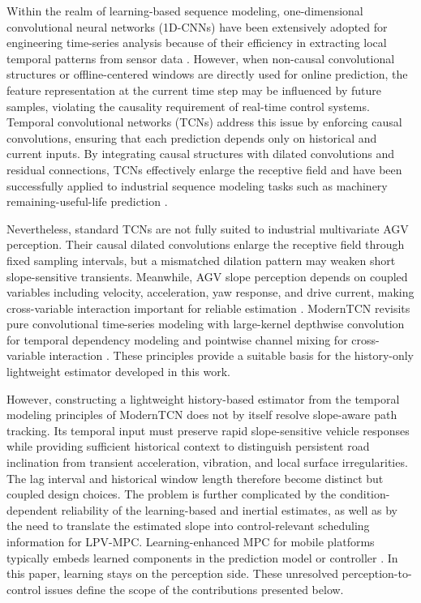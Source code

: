 \documentclass{ieeeaccess}
\newcommand{\citep}[1]{\cite{#1}}
\begin{document}
Within the realm of learning-based sequence modeling, one-dimensional convolutional neural networks (1D-CNNs) have been extensively adopted for engineering time-series analysis because of their efficiency in extracting local temporal patterns from sensor data \citep{Bueno2023Inception1DCNN}. However, when non-causal convolutional structures or offline-centered windows are directly used for online prediction, the feature representation at the current time step may be influenced by future samples, violating the causality requirement of real-time control systems. Temporal convolutional networks (TCNs) address this issue by enforcing causal convolutions, ensuring that each prediction depends only on historical and current inputs. By integrating causal structures with dilated convolutions and residual connections, TCNs effectively enlarge the receptive field and have been successfully applied to industrial sequence modeling tasks such as machinery remaining-useful-life prediction \citep{Bai2018TCN,Cao2021TCNRSA}.

Nevertheless, standard TCNs are not fully suited to industrial multivariate AGV perception. Their causal dilated convolutions enlarge the receptive field through fixed sampling intervals, but a mismatched dilation pattern may weaken short slope-sensitive transients. Meanwhile, AGV slope perception depends on coupled variables including velocity, acceleration, yaw response, and drive current, making cross-variable interaction important for reliable estimation \citep{Jin2023MTGODE}. ModernTCN revisits pure convolutional time-series modeling with large-kernel depthwise convolution for temporal dependency modeling and pointwise channel mixing for cross-variable interaction \citep{Luo2024ModernTCN}. These principles provide a suitable basis for the history-only lightweight estimator developed in this work.

However, constructing a lightweight history-based estimator from the temporal modeling principles of ModernTCN does not by itself resolve slope-aware path tracking. Its temporal input must preserve rapid slope-sensitive vehicle responses while providing sufficient historical context to distinguish persistent road inclination from transient acceleration, vibration, and local surface irregularities. The lag interval and historical window length therefore become distinct but coupled design choices. The problem is further complicated by the condition-dependent reliability of the learning-based and inertial estimates, as well as by the need to translate the estimated slope into control-relevant scheduling information for LPV-MPC. Learning-enhanced MPC for mobile platforms typically embeds learned components in the prediction model or controller \citep{Zhang2022LBMPCSurvey,Li2024PINNAGV}. In this paper, learning stays on the perception side. These unresolved perception-to-control issues define the scope of the contributions presented below.
\end{document}
